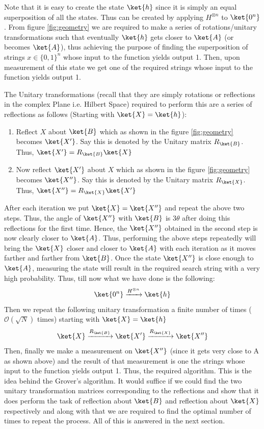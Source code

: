 \documentclass[12pt, oneside]{book}
\theoremstyle{definition}
\theoremstyle{definition}
\theoremstyle{remark}
\begin{document}
Note that it is easy to create the state $\ket{h}$ since it is simply an equal superposition of all the states. Thus can be created by applying $H^{\otimes n}$ to $\ket{0^n}$. From figure \ref{fig:geometry} we are required to make a series of rotations/unitary transformations such that eventually $\ket{h}$ gets closer to $\ket{A}$ (or becomes $\ket{A}$), thus achieving the purpose of finding the superposition of strings $x \in \{0,1\}^n$ whose input to the function yields output 1. Then, upon measurement of this state we get one of the required strings whose input to the function yields output 1.

The Unitary transformations (recall that they are simply rotations or reflections in the complex Plane i.e. Hilbert Space) required to perform this are a series of reflections as follows (Starting with $\ket{X}=\ket{h}$):
\begin{enumerate}
    \item Reflect $X$ about $\ket{B}$ which as shown in the figure \ref{fig:geometry} becomes $\ket{X'}$. Say this is denoted by the Unitary matrix $R_{\ket{B}}$. Thus, $\ket{X'}=R_{\ket{B}}\ket{X}$
    \item Now reflect $\ket{X'}$ about $X$ which as shown in the figure \ref{fig:geometry} becomes $\ket{X''}$. Say this is denoted by the Unitary matrix $R_{\ket{X}}$. Thus, $\ket{X''}=R_{\ket{X}}\ket{X'}$
\end{enumerate}
After each iteration we put $\ket{X}=\ket{X''}$ and repeat the above two steps.
Thus, the angle of $\ket{X''}$ with $\ket{B}$ is $3\theta$ after doing this reflections for the first time.
Hence, the $\ket{X''}$ obtained in the second step is now clearly closer to $\ket{A}$. Thus, performing the above steps repeatedly will bring the $\ket{X}$ closer and closer to $\ket{A}$ with each iteration as it moves farther and farther from $\ket{B}$. Once the state $\ket{X''}$ is close enough to $\ket{A}$, measuring the state will result in the required search string with a very high probability.
Thus, till now what we have done is the following:
\[
\ket{0^n}\xrightarrow{H^{\otimes n}} \ket{h}
\]
Then we repeat the following unitary transformation a finite number of times ($\mathcal{O}(\sqrt{N})$ times) starting with $\ket{X}=\ket{h}$
\[
\ket{X} \xrightarrow{R_{\ket{B}}} \ket{X'} \xrightarrow{R_{\ket{X}}} \ket{X''}
\]
Then, finally we make a measurement on $\ket{X''}$ (since it gets very close to A as shown above) and the result of that measurement is one the strings whose input to the function yields output 1. Thus, the required algorithm. This is the idea behind the Grover's algorithm.
It would suffice if we could find the two unitary transformation matrices corresponding to the reflections and show that it does perform the task of reflection about $\ket{B}$ and reflection about $\ket{X}$ respectively and along with that we are required to find the optimal number of times to repeat the process. All of this is answered in the next section.
\end{document}
